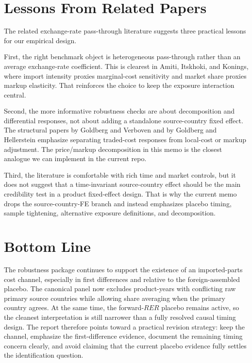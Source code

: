 \documentclass[11pt]{article}
\begin{document}
\section*{Lessons From Related Papers}

The related exchange-rate pass-through literature suggests three practical lessons for our empirical design.

First, the right benchmark object is heterogeneous pass-through rather than an average exchange-rate coefficient. This is clearest in Amiti, Itskhoki, and Konings, where import intensity proxies marginal-cost sensitivity and market share proxies markup elasticity. That reinforces the choice to keep the exposure interaction central.

Second, the more informative robustness checks are about decomposition and differential responses, not about adding a standalone source-country fixed effect. The structural papers by Goldberg and Verboven and by Goldberg and Hellerstein emphasize separating traded-cost responses from local-cost or markup adjustment. The price/markup decomposition in this memo is the closest analogue we can implement in the current repo.

Third, the literature is comfortable with rich time and market controls, but it does not suggest that a time-invariant source-country effect should be the main credibility test in a product fixed-effect design. That is why the current memo drops the source-country-FE branch and instead emphasizes placebo timing, sample tightening, alternative exposure definitions, and decomposition.

\section*{Bottom Line}

The robustness package continues to support the existence of an imported-parts cost channel, especially in first differences and relative to the foreign-assembled placebo. The canonical panel now excludes product-years with conflicting raw primary source countries while allowing share averaging when the primary country agrees. At the same time, the forward-\(RER\) placebo remains active, so the cleanest interpretation is still narrower than a fully resolved causal timing design. The report therefore points toward a practical revision strategy: keep the channel, emphasize the first-difference evidence, document the remaining timing concern clearly, and avoid claiming that the current placebo evidence fully settles the identification question.
\end{document}
